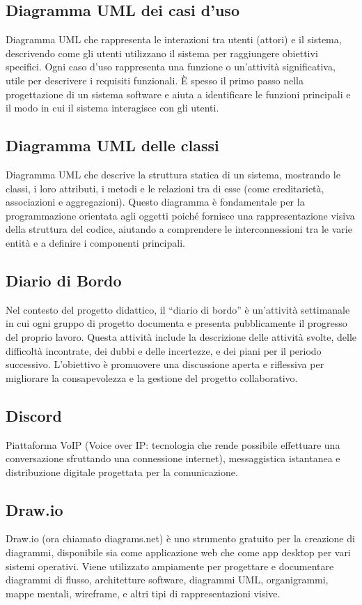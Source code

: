 \subsection*{Diagramma UML dei casi d'uso}
Diagramma UML che rappresenta le interazioni tra utenti (attori) e il sistema, descrivendo come gli utenti utilizzano il sistema per raggiungere obiettivi 
specifici. Ogni caso d'uso rappresenta una funzione o un'attività significativa, utile per descrivere i requisiti funzionali. È spesso il primo passo nella 
progettazione di un sistema software e aiuta a identificare le funzioni principali e il modo in cui il sistema interagisce con gli utenti.

\subsection*{Diagramma UML delle classi}
Diagramma UML che descrive la struttura statica di un sistema, mostrando le classi, i loro attributi, i metodi e le relazioni tra di esse (come ereditarietà, 
associazioni e aggregazioni). Questo diagramma è fondamentale per la programmazione orientata agli oggetti poiché fornisce una rappresentazione visiva della 
struttura del codice, aiutando a comprendere le interconnessioni tra le varie entità e a definire i componenti principali.

\hypertarget{sec:diario_di_bordo}{}
\subsection*{Diario di Bordo}
Nel contesto del progetto didattico, il “diario di bordo” è un’attività settimanale in cui ogni gruppo di progetto documenta e presenta pubblicamente il progresso del proprio lavoro. 
Questa attività include la descrizione delle attività svolte, delle difficoltà incontrate, dei dubbi e delle incertezze, e dei piani per il periodo successivo. 
L’obiettivo è promuovere una discussione aperta e riflessiva per migliorare la consapevolezza e la gestione del progetto collaborativo.

\subsection*{Discord}
Piattaforma VoIP (Voice over IP: tecnologia che rende possibile effettuare una conversazione sfruttando una connessione internet), messaggistica istantanea 
e distribuzione digitale progettata per la comunicazione.

\subsection*{Draw.io}
Draw.io (ora chiamato diagrams.net) è uno strumento gratuito per la creazione di diagrammi, disponibile sia come applicazione web che come app desktop per 
vari sistemi operativi. Viene utilizzato ampiamente per progettare e documentare diagrammi di flusso, architetture software, diagrammi UML, organigrammi, 
mappe mentali, wireframe, e altri tipi di rappresentazioni visive.

